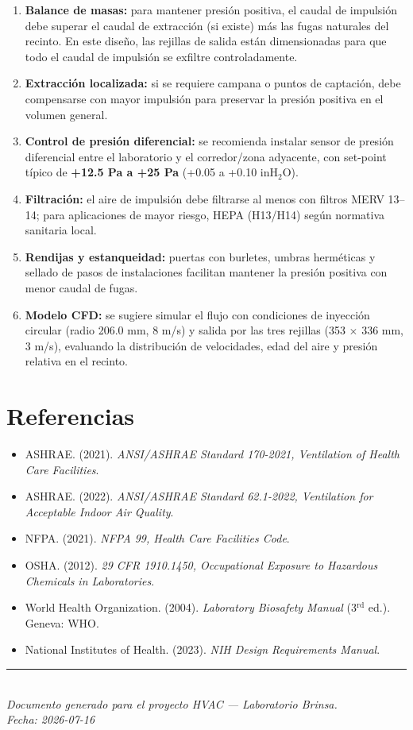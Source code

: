 \documentclass[12pt,a4paper]{article}
\begin{document}
\begin{enumerate}[leftmargin=*]
    \item \textbf{Balance de masas:} para mantener presión positiva, el caudal de impulsión debe superar el caudal de extracción (si existe) más las fugas naturales del recinto. En este diseño, las rejillas de salida están dimensionadas para que todo el caudal de impulsión se exfiltre controladamente.

    \item \textbf{Extracción localizada:} si se requiere campana o puntos de captación, debe compensarse con mayor impulsión para preservar la presión positiva en el volumen general.

    \item \textbf{Control de presión diferencial:} se recomienda instalar sensor de presión diferencial entre el laboratorio y el corredor/zona adyacente, con set-point típico de \textbf{+12.5 Pa a +25 Pa} (+0.05 a +0.10 inH$_2$O).

    \item \textbf{Filtración:} el aire de impulsión debe filtrarse al menos con filtros MERV 13--14; para aplicaciones de mayor riesgo, HEPA (H13/H14) según normativa sanitaria local.

    \item \textbf{Rendijas y estanqueidad:} puertas con burletes, umbras herméticas y sellado de pasos de instalaciones facilitan mantener la presión positiva con menor caudal de fugas.

    \item \textbf{Modelo CFD:} se sugiere simular el flujo con condiciones de inyección circular (radio 206.0 mm, 8 m/s) y salida por las tres rejillas (353 $\times$ 336 mm, 3 m/s), evaluando la distribución de velocidades, edad del aire y presión relativa en el recinto.
\end{enumerate}

\section{Referencias}

\begin{itemize}[leftmargin=*]
    \item ASHRAE. (2021). \textit{ANSI/ASHRAE Standard 170-2021, Ventilation of Health Care Facilities}.
    \item ASHRAE. (2022). \textit{ANSI/ASHRAE Standard 62.1-2022, Ventilation for Acceptable Indoor Air Quality}.
    \item NFPA. (2021). \textit{NFPA 99, Health Care Facilities Code}.
    \item OSHA. (2012). \textit{29 CFR 1910.1450, Occupational Exposure to Hazardous Chemicals in Laboratories}.
    \item World Health Organization. (2004). \textit{Laboratory Biosafety Manual} (3$^\text{rd}$ ed.). Geneva: WHO.
    \item National Institutes of Health. (2023). \textit{NIH Design Requirements Manual}.
\end{itemize}

\vfill
\noindent\rule{\textwidth}{0.4pt}\\
\textit{Documento generado para el proyecto HVAC --- Laboratorio Brinsa.}\\
\textit{Fecha: 2026-07-16}
\end{document}
